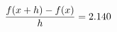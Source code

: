 \documentclass[preview]{standalone}
\begin{document}
\begin{align*}
\special{dvisvgm:raw <g id='unique000'>}\frac{f(x+h)-f(x)}{h} = 2.140\special{dvisvgm:raw </g>}
\end{align*}
\end{document}
